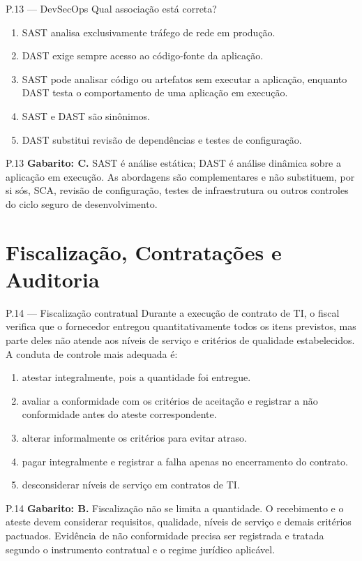 \begin{questao}{ P.13 — DevSecOps}
Qual associação está correta?
\begin{enumerate}[label=\Alph*)]
\item SAST analisa exclusivamente tráfego de rede em produção.
\item DAST exige sempre acesso ao código-fonte da aplicação.
\item SAST pode analisar código ou artefatos sem executar a aplicação, enquanto DAST testa o comportamento de uma aplicação em execução.
\item SAST e DAST são sinônimos.
\item DAST substitui revisão de dependências e testes de configuração.
\end{enumerate}
\end{questao}
\begin{solucao}{P.13}
\textbf{Gabarito: C.} SAST é análise estática; DAST é análise dinâmica sobre a aplicação em execução. As abordagens são complementares e não substituem, por si sós, SCA, revisão de configuração, testes de infraestrutura ou outros controles do ciclo seguro de desenvolvimento.
\end{solucao}

\section{Fiscalização, Contratações e Auditoria}

\begin{questao}{ P.14 — Fiscalização contratual}
Durante a execução de contrato de TI, o fiscal verifica que o fornecedor entregou quantitativamente todos os itens previstos, mas parte deles não atende aos níveis de serviço e critérios de qualidade estabelecidos. A conduta de controle mais adequada é:
\begin{enumerate}[label=\Alph*)]
\item atestar integralmente, pois a quantidade foi entregue.
\item avaliar a conformidade com os critérios de aceitação e registrar a não conformidade antes do ateste correspondente.
\item alterar informalmente os critérios para evitar atraso.
\item pagar integralmente e registrar a falha apenas no encerramento do contrato.
\item desconsiderar níveis de serviço em contratos de TI.
\end{enumerate}
\end{questao}
\begin{solucao}{P.14}
\textbf{Gabarito: B.} Fiscalização não se limita a quantidade. O recebimento e o ateste devem considerar requisitos, qualidade, níveis de serviço e demais critérios pactuados. Evidência de não conformidade precisa ser registrada e tratada segundo o instrumento contratual e o regime jurídico aplicável.
\end{solucao}

